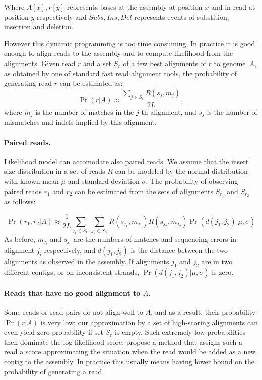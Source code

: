 Where $A[x], r[y]$ represents bases at the assembly at position $x$ and in read at
position $y$ respectively and $Subs, Ins, Del$ represents events of substition, insertion
and deletion.

However this dynamic programming is too time consuming. 
In practice it is good enough to align reads to the assembly and to compute
likelihood from the alignments.
Given read $r$ and 
a set $S_r$ of a few best alignments of $r$ to
genome~$A$, as obtained by one of standard fast read alignment tools, the
probability of generating read $r$ can be estimated as:
\begin{equation}
\Pr(r|A)\approx \frac{\sum_{j\in S_r} R(s_j, m_j)}{2L},
\end{equation}
where $m_j$ is the number of matches in the $j$-th alignment, and
$s_j$ is the number of mismatches and indels implied by this alignment.

\paragraph{Paired reads.}
Likelihood model can accomodate also paired reads.
We assume that the insert size distribution in a set of reads $R$ 
can be modeled by the normal
distribution with known mean $\mu$ and standard deviation $\sigma$.
The probability of observing paired reads $r_1$ and $r_2$ 
can be estimated from the sets of alignments $S_{r_1}$ and $S_{r_2}$ as follows:

\begin{equation}
\Pr(r_1, r_2|A) \approx 
\frac{1}{2L}
\displaystyle\sum_{j_1 \in S_{r_1}} 
\displaystyle\sum_{j_2 \in S_{r_2}} 
R(s_{j_1}, m_{j_1}) R(s_{j_2}, m_{j_2})
\Pr(d(j_1, j_2)|\mu, \sigma)
\end{equation}
As before, $m_{j_i}$ and $s_{j_i}$ are the numbers of matches and
sequencing errors in alignment $j_i$ respectively, 
and $d(j_1,j_2)$ is the distance between the two alignments
as observed in the assembly. 
If alignments $j_1$ and $j_2$ are in two different contigs,
or on inconsistent strands, $\Pr(d(j_1, j_2)|\mu, \sigma)$ is zero.

\paragraph{Reads that have no good alignment to $A$.}
Some reads or read pairs do not align well to $A$, and as a result, their
probability $\Pr(r|A)$ is very low; our approximation by a set of
high-scoring alignments can even yield zero probability if set $S_r$
is empty.  Such extremely low probabilities then dominate the log
likelihood score. \citet{Ghodsi2013} propose a method that assigns
such a read a score approximating the situation when the read would be
added as a new contig to the assembly. In practice this usually
means having lower bound on the probability of generating a read.

